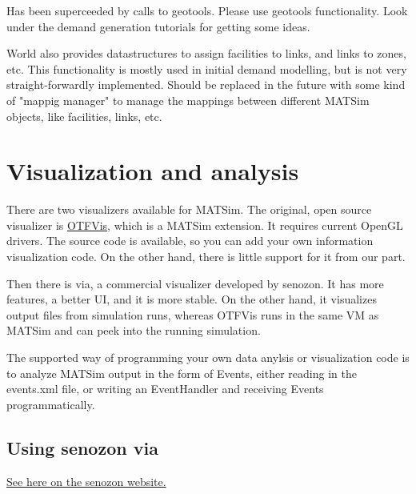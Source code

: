 \documentclass[a4paper,11pt]{report}
\begin{document}
Has been superceeded by calls to geotools. Please use geotools  functionality. Look under the demand generation tutorials for  getting some ideas.

World also provides datastructures to assign facilities to links, and  links to zones, etc. This functionality is mostly used in initial  demand modelling, but is not very straight-forwardly implemented. Should  be replaced in the future with some kind of "mappig manager" to manage  the mappings between different MATSim objects, like facilities, links,  etc.

\chapter{Visualization and analysis}

There are two visualizers available for MATSim. The original, open source visualizer is \href{http://matsim.org/docs/extensions/otfvis}{OTFVis},  which is a MATSim extension. It requires current OpenGL drivers. The  source code is available, so you can add your own information  visualization code. On the other hand, there is little support for it  from our part.

Then there is via, a commercial visualizer developed by senozon. It  has more features, a better UI, and it is more stable. On the other  hand, it visualizes output files from simulation runs, whereas OTFVis  runs in the same VM as MATSim and can peek into the running simulation.

The supported way of programming your own data anylsis or  visualization code is to analyze MATSim output in the form of Events,  either reading in the events.xml file, or writing an EventHandler and  receiving Events programmatically.

\vfill\eject
\section{Using senozon via}



\href{http://senozon.com/products/via}{See here on the senozon website.}
\end{document}
